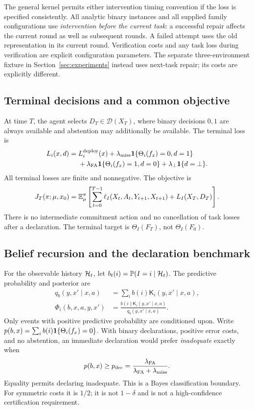 The general kernel permits either intervention timing convention if the loss is
specified consistently. All analytic binary instances and all supplied family
configurations use \emph{intervention before the current task}: a successful
repair affects the current round as well as subsequent rounds. A failed attempt
uses the old representation in its current round. Verification costs and any
task loss during verification are explicit configuration parameters. The separate three-environment fixture in Section~\ref{sec:experiments} instead uses next-task repair; its costs are explicitly different.

\subsection{Terminal decisions and a common objective}
At time $T$, the agent selects $D_T\in\mathcal D(X_T)$, where binary decisions
$0,1$ are always available and abstention may additionally be available.
The terminal loss is
\begin{align}
L_i(x,d)={}&L_i^{\rm deploy}(x)
 +\lambda_{\rm miss}\mathbf 1\{\Theta_i(f_x)=0,d=1\}\nonumber\\
 &+\lambda_{\rm FA}\mathbf 1\{\Theta_i(f_x)=1,d=0\}
 +\lambda_\bot\mathbf 1\{d=\bot\}.
\end{align}
All terminal losses are finite and nonnegative. The objective is
\begin{equation}
J_T(\pi;\mu,x_0)=
\mathbb E_\mu^\pi\left[\sum_{t=0}^{T-1}\ell_I(X_t,A_t,Y_{t+1},X_{t+1})
             +L_I(X_T,D_T)\right].
\label{eq:objective}
\end{equation}
There is no intermediate commitment action and no cancellation of task losses
after a declaration. The terminal target is $\Theta_I(F_T)$, not
$\Theta_I(F_0)$.

\subsection{Belief recursion and the declaration benchmark}
For the observable history $\mathcal H_t$, let
$b_t(i)=\mathbb P(I=i\mid\mathcal H_t)$. The predictive probability and posterior are
\begin{align}
q_b(y,x'\mid x,a)&=\sum_i b(i)\mathsf K_i(y,x'\mid x,a),\\
\Phi_i(b,x,a,y,x')&=
\frac{b(i)\mathsf K_i(y,x'\mid x,a)}{q_b(y,x'\mid x,a)}.
\end{align}
Only events with positive predictive probability are conditioned upon.
Write $p(b,x)=\sum_i b(i)\mathbf 1\{\Theta_i(f_x)=0\}$. With binary declarations,
positive error costs, and no abstention, an immediate declaration would prefer
\emph{inadequate} exactly when
\begin{equation}
p(b,x)\ge p_{\mathrm{dec}}
=\frac{\lambda_{\rm FA}}{\lambda_{\rm FA}+\lambda_{\rm miss}}.
\label{eq:declaration}
\end{equation}
Equality permits declaring inadequate. This is a Bayes classification boundary.
For symmetric costs it is $1/2$; it is not $1-\delta$ and is not a
high-confidence certification requirement.

